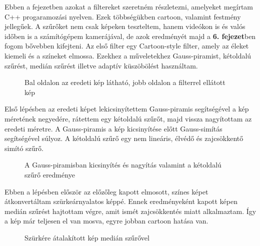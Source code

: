 
Ebben a fejezetben azokat a filtereket szeretném részletezni, amelyeket megírtam C++ progaramozási nyelven. Ezek többségükben cartoon, valamint festmény jellegűek. A szűrőket nem csak képeken teszteltem, hanem videókon is és valós időben is a számítógépem kamerájával, de azok eredményét majd a \textbf{6. fejezet}ben fogom bővebben kifejteni.
Az első filter egy Cartoon-style filter, amely az éleket kiemeli és a színeket elmossa. Ezekhez a műveletekhez Gauss-piramist, kétoldalú szűrést, medián szűrést illetve adaptív küszöbölést használtam.
\begin{figure}[ht]
\centering
{}
\caption{Bal oldalon az eredeti kép látható, jobb oldalon a filterrel ellátott kép} 
\label{fig: cartoon1}
\end{figure}
Első lépésben az eredeti képet lekicsinyítettem Gauss-piramis segítségével a kép méretének negyedére, rátettem egy kétoldalú szűrőt, majd vissza nagyítottam az eredeti méretre. A Gauss-piramis a kép kicsinyítése előtt Gauss-simítás segítségével súlyoz. A kétoldalú szűrő egy nem lineáris, élvédő és zajcsökkentő simító szűrő.
\begin{figure}[ht]
\centering
{}
\caption{A Gauss-piramisban kicsinyítés és nagyítás valamint a kétoldalú szűrő eredménye } 
\label{fig: cartoon2}
\end{figure}



Ebben a lépésben először az előzőleg kapott elmosott, színes képet átkonvertáltam szürkeárnyalatos képpé. Ennek eredményeként kapott képen medián szűrést hajtottam végre, amit ismét zajcsökkentés miatt alkalmaztam. Így a kép már teljesen el van mosva, egyre jobban cartoon hatása van.
\begin{figure}[ht]
\centering
{}
\caption{Szürkére átalakított kép medián szűrővel } 
\label{fig: cartoon3}
\end{figure}


